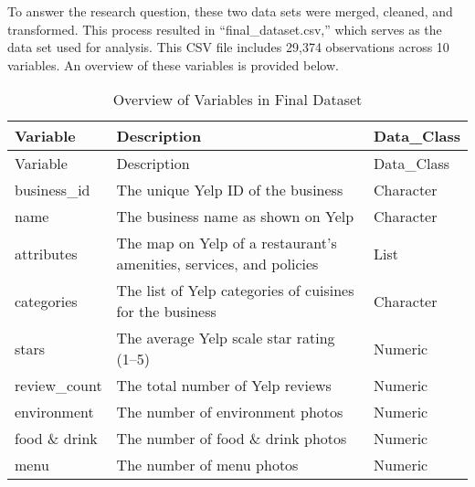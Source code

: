 \documentclass[
]{article}
\begin{document}
To answer the research question, these two data sets were merged,
cleaned, and transformed. This process resulted in
``final\_dataset.csv,'' which serves as the data set used for analysis.
This CSV file includes 29,374 observations across 10 variables. An
overview of these variables is provided below.

\begin{longtable}[]{@{}
  >{\raggedright\arraybackslash}p{}
  >{\raggedright\arraybackslash}p{}
  >{\raggedright\arraybackslash}p{}@{}}
\caption{Overview of Variables in Final Dataset}\tabularnewline
\toprule\noalign{}
\begin{minipage}[b]{\linewidth}\raggedright
Variable
\end{minipage} & \begin{minipage}[b]{\linewidth}\raggedright
Description
\end{minipage} & \begin{minipage}[b]{\linewidth}\raggedright
Data\_Class
\end{minipage} \\
\midrule\noalign{}
\endfirsthead
\toprule\noalign{}
\begin{minipage}[b]{\linewidth}\raggedright
Variable
\end{minipage} & \begin{minipage}[b]{\linewidth}\raggedright
Description
\end{minipage} & \begin{minipage}[b]{\linewidth}\raggedright
Data\_Class
\end{minipage} \\
\midrule\noalign{}
\endhead
\bottomrule\noalign{}
\endlastfoot
business\_id & The unique Yelp ID of the business & Character \\
name & The business name as shown on Yelp & Character \\
attributes & The map on Yelp of a restaurant's amenities, services, and
policies & List \\
categories & The list of Yelp categories of cuisines for the business &
Character \\
stars & The average Yelp scale star rating (1--5) & Numeric \\
review\_count & The total number of Yelp reviews & Numeric \\
environment & The number of environment photos & Numeric \\
food \& drink & The number of food \& drink photos & Numeric \\
menu & The number of menu photos & Numeric \\
\end{longtable}
\end{document}

